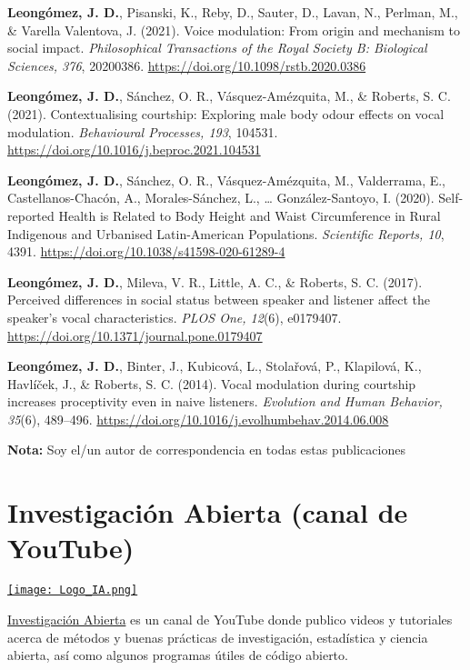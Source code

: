 \documentclass[11pt,a4paper,]{awesome-cv}
\begin{document}
\textbf{Leongómez, J. D.}, Pisanski, K., Reby, D., Sauter, D., Lavan,
N., Perlman, M., \& Varella Valentova, J. (2021). Voice modulation: From
origin and mechanism to social impact. \emph{Philosophical Transactions
of the Royal Society B: Biological Sciences, 376}, 20200386.
\url{https://doi.org/10.1098/rstb.2020.0386}

\textbf{Leongómez, J. D.}, Sánchez, O. R., Vásquez-Amézquita, M., \&
Roberts, S. C. (2021). Contextualising courtship: Exploring male body
odour effects on vocal modulation. \emph{Behavioural Processes, 193},
104531. \url{https://doi.org/10.1016/j.beproc.2021.104531}

\textbf{Leongómez, J. D.}, Sánchez, O. R., Vásquez-Amézquita, M.,
Valderrama, E., Castellanos-Chacón, A., Morales-Sánchez, L., \ldots{}
González-Santoyo, I. (2020). Self-reported Health is Related to Body
Height and Waist Circumference in Rural Indigenous and Urbanised
Latin-American Populations. \emph{Scientific Reports, 10}, 4391.
\url{https://doi.org/10.1038/s41598-020-61289-4}

\textbf{Leongómez, J. D.}, Mileva, V. R., Little, A. C., \& Roberts, S.
C. (2017). Perceived differences in social status between speaker and
listener affect the speaker's vocal characteristics. \emph{PLOS One,
12}(6), e0179407. \url{https://doi.org/10.1371/journal.pone.0179407}

\textbf{Leongómez, J. D.}, Binter, J., Kubicová, L., Stolařová, P.,
Klapilová, K., Havlíček, J., \& Roberts, S. C. (2014). Vocal modulation
during courtship increases proceptivity even in naive listeners.
\emph{Evolution and Human Behavior, 35}(6), 489--496.
\url{https://doi.org/10.1016/j.evolhumbehav.2014.06.008}

\endgroup

\begin{footnotesize}
\textbf{Nota:} Soy el/un autor de correspondencia en todas estas publicaciones
\end{footnotesize}

\hypertarget{investigaciuxf3n-abierta-canal-de-youtube}{%
\section{Investigación Abierta (canal de
YouTube)}\label{investigaciuxf3n-abierta-canal-de-youtube}}

\begin{minipage}[c]{0.15\linewidth}
\href{https://www.youtube.com/@InvestigacionAbierta}{\texttt{[image: Logo\_IA.png]}}
\end{minipage} \begin{minipage}[c]{0.85\linewidth}
\textcolor{red}{\faYoutube} \href{https://www.youtube.com/@InvestigacionAbierta}{Investigación Abierta} es un canal de YouTube donde publico videos y tutoriales acerca de métodos y buenas prácticas de investigación, estadística y ciencia abierta, así como algunos programas útiles de código abierto.
\end{minipage}
\end{document}
